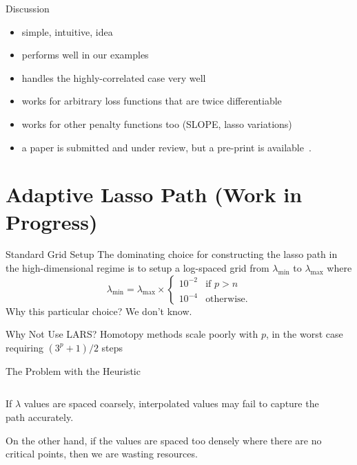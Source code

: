 \begin{frame}{Discussion}
  \begin{itemize}
    \item simple, intuitive, idea
    \item performs well in our examples
    \item handles the highly-correlated case very well
    \item works for arbitrary loss functions that are twice differentiable
    \item works for other penalty functions too (SLOPE, lasso variations)
    \item a paper is submitted and under review, but a pre-print is
      available~\parencite{larsson2021}.
  \end{itemize}
\end{frame}

\section{Adaptive Lasso Path (Work in Progress)}

\begin{frame}{Standard Grid Setup}
  The dominating choice for constructing the lasso path in the high-dimensional
  regime is to setup a log-spaced grid from \(\lambda_\text{min}\) to
  \(\lambda_\text{max}\) where
  \[
    \lambda_\text{min} =\lambda_\text{max} \times
    \begin{cases}
      10^{-2} & \text{if } p > n  \\
      10^{-4} & \text{otherwise.}
    \end{cases}
  \]
  Why this particular choice? We don't know.

  \begin{block}{Why Not Use LARS?}
    Homotopy methods scale poorly with \(p\), in the worst case requiring
    \((3^p
    + 1)/2\) steps
  \end{block}
\end{frame}

\begin{frame}{The Problem with the Heuristic}
  \begin{columns}[T]
    \begin{column}{0.45\linewidth}
      If $\lambda$ values are spaced \alert{coarsely}, interpolated values may
      fail to capture the path accurately.

      \medskip

      On the other hand, if the values are spaced too densely where there are
      no critical points, then we are \alert{wasting} resources.
    \end{column}
    \begin{column}{0.45\linewidth}
        
    \end{column}
  \end{columns}
\end{frame}

